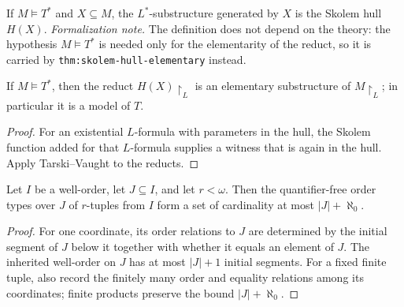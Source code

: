 \begin{definition}
\label{def:skolem-hull}
\leanok
{}
If \(M\models T^*\) and \(X\subseteq M\), the \(L^*\)-substructure
generated by \(X\) is the Skolem hull \(H(X)\).
\emph{Formalization note.}  The definition does not depend on the
theory: the hypothesis \(M\models T^*\) is needed only for the
elementarity of the reduct, so it is carried by
\texttt{thm:skolem-hull-elementary} instead.
\end{definition}

\begin{theorem}
\label{thm:skolem-hull-elementary}
\leanok
{}
If \(M\models T^*\), then the reduct \(H(X)\!\upharpoonright_L\) is an
elementary substructure of \(M\!\upharpoonright_L\); in particular it is
a model of \(T\).
\end{theorem}

\begin{proof}
For an existential \(L\)-formula with parameters in the hull, the
Skolem function added for that \(L\)-formula supplies a witness that is
again in the hull.  Apply Tarski--Vaught to the reducts.
\end{proof}

\begin{lemma}
\label{lem:few-relative-order-types}
Let \(I\) be a well-order, let \(J\subseteq I\), and let \(r<\omega\).
Then the quantifier-free order types over \(J\) of \(r\)-tuples from
\(I\) form a set of cardinality at most \(|J|+\aleph_0\).
\end{lemma}

\begin{proof}
For one coordinate, its order relations to \(J\) are determined by the
initial segment of \(J\) below it together with whether it equals an
element of \(J\).  The inherited well-order on \(J\) has at most
\(|J|+1\) initial segments.  For a fixed finite tuple, also record the
finitely many order and equality relations among its coordinates; finite
products preserve the bound \(|J|+\aleph_0\).
\end{proof}

